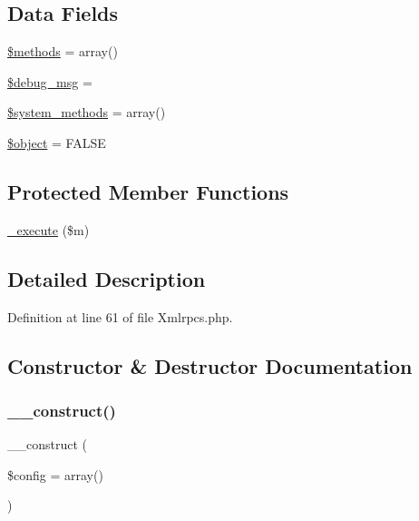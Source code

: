 \subsection*{Data Fields}
\begin{DoxyCompactItemize}
\item 
\mbox{\hyperlink{class_c_i___xmlrpcs_a802753499268a04da139bd6e6ef89b35}{\$methods}} = array()
\item 
\mbox{\hyperlink{class_c_i___xmlrpcs_afed2f9c39f2e406bcdff222ce412bda8}{\$debug\+\_\+msg}} = \textquotesingle{}\textquotesingle{}
\item 
\mbox{\hyperlink{class_c_i___xmlrpcs_a07c837152d76c5e72b0bd7a065fa9c10}{\$system\+\_\+methods}} = array()
\item 
\mbox{\hyperlink{class_c_i___xmlrpcs_a52123b83a1952a68c5513e47d59ec4a6}{\$object}} = F\+A\+L\+SE
\end{DoxyCompactItemize}
\subsection*{Protected Member Functions}
\begin{DoxyCompactItemize}
\item 
\mbox{\hyperlink{class_c_i___xmlrpcs_a2f039adb8ec59c693300993c95138b46}{\+\_\+execute}} (\$m)
\end{DoxyCompactItemize}


\subsection{Detailed Description}


Definition at line 61 of file Xmlrpcs.\+php.



\subsection{Constructor \& Destructor Documentation}
\mbox{\label{class_c_i___xmlrpcs_af7f9493844d2d66e924e3c1df51ce616}} 
\subsubsection{\texorpdfstring{\_\_construct()}{\_\_construct()}}
{\footnotesize\ttfamily \+\_\+\+\_\+construct (\begin{DoxyParamCaption}\item[{}]{\$config = {\ttfamily array()} }\end{DoxyParamCaption})}


